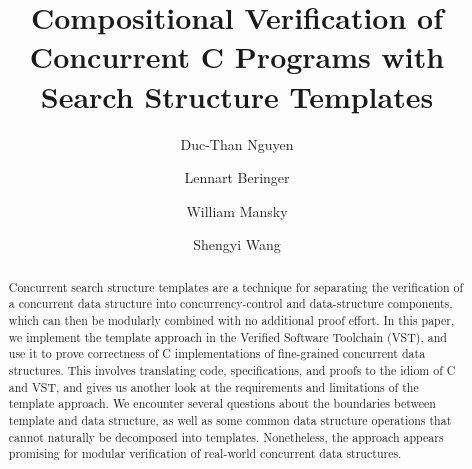\documentclass[sigplan,screen]{acmart}
\begin{document}
\title{Compositional Verification of Concurrent C Programs with Search Structure Templates}

\author{Duc-Than Nguyen}

\author{Lennart Beringer}

\author{William Mansky}

\author{Shengyi Wang}

\begin{abstract}
Concurrent search structure templates are a technique for separating the verification of a concurrent data structure into concurrency-control and data-structure components, which can then be modularly combined with no additional proof effort. In this paper, we implement the template approach in the Verified Software Toolchain (VST), and use it to prove correctness of C implementations of fine-grained concurrent data structures. This involves translating code, specifications, and proofs to the idiom of C and VST, and gives us another look at the requirements and limitations of the template approach.
We encounter several questions about the boundaries between template and data structure, as well as some common data structure operations that cannot naturally be decomposed into templates. Nonetheless, the approach appears promising for modular verification of real-world concurrent data structures.
\end{abstract}

\end{document}
